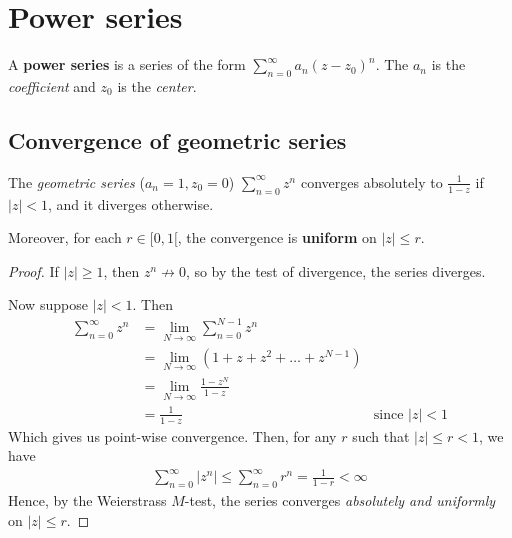 \documentclass[12pt]{article}
\begin{document}
\section{Power series}
 A \textbf{power series} is a series of the form $\sum_{n=0}^{\infty}a_n(z-z_0)^n$. The $a_n$ is the \textit{coefficient} and $z_0$ is the \textit{center}.

\subsection{Convergence of geometric series}

\begin{theorem}
    The \textit{geometric series} ($a_n=1, z_0=0$) $\sum_{n=0}^{\infty}z^n$ converges absolutely to $\frac{1}{1-z}$ if $|z|<1$, and it diverges otherwise. 

    Moreover, for each $r\in [0,1[$, the convergence is \textbf{uniform} on $|z|\leq r$.
\end{theorem}
\begin{proof}
    If $|z|\geq 1$, then $z^n\not\to 0$, so by the test of divergence, the series diverges.

    Now suppose $|z|<1$. Then \begin{align*}
        \sum_{n=0}^{\infty}z^n &= \lim_{N\to \infty}\sum_{n=0}^{N-1}z^n\\
        &= \lim_{N\to \infty}(1+z+z^2+\dots+z^{N-1})\\
        &= \lim_{N\to \infty}\frac{1-z^N}{1-z}\\
        &= \frac{1}{1-z} &\text{since }|z|<1
    \end{align*}
    Which gives us point-wise convergence. Then, for any $r$ such that $|z|\leq r<1$, we have \begin{align*}
        \sum_{n=0}^{\infty}|z^n|\leq \sum_{n=0}^{\infty}r^n =\frac{1}{1-r}<\infty
    \end{align*}
    Hence, by the Weierstrass $M$-test, the series converges \textit{absolutely and uniformly} on $|z|\leq r$.
\end{proof}
\end{document}
